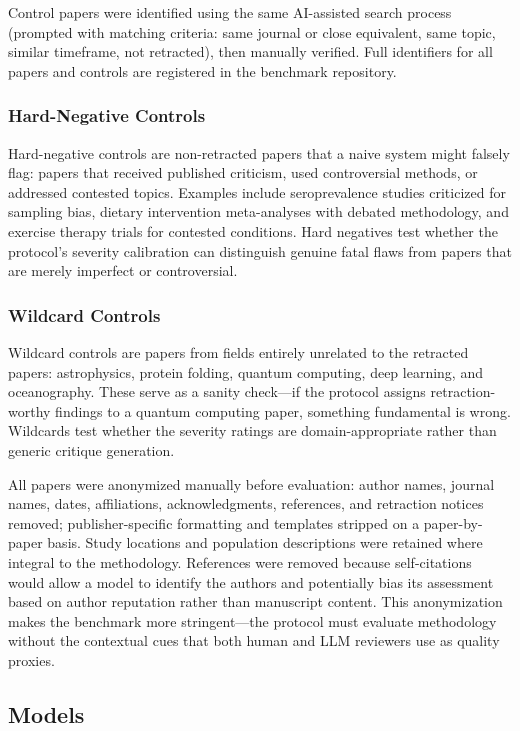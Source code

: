 \documentclass[11pt]{article}
\begin{document}
Control papers were identified using the same AI-assisted search process (prompted with matching criteria: same journal or close equivalent, same topic, similar timeframe, not retracted), then manually verified. Full identifiers for all papers and controls are registered in the benchmark repository.

\subsubsection{Hard-Negative Controls}

Hard-negative controls are non-retracted papers that a naive system might falsely flag: papers that received published criticism, used controversial methods, or addressed contested topics. Examples include seroprevalence studies criticized for sampling bias, dietary intervention meta-analyses with debated methodology, and exercise therapy trials for contested conditions. Hard negatives test whether the protocol's severity calibration can distinguish genuine fatal flaws from papers that are merely imperfect or controversial.

\subsubsection{Wildcard Controls}

Wildcard controls are papers from fields entirely unrelated to the retracted papers: astrophysics, protein folding, quantum computing, deep learning, and oceanography. These serve as a sanity check---if the protocol assigns retraction-worthy findings to a quantum computing paper, something fundamental is wrong. Wildcards test whether the severity ratings are domain-appropriate rather than generic critique generation.

All papers were anonymized manually before evaluation: author names, journal names, dates, affiliations, acknowledgments, references, and retraction notices removed; publisher-specific formatting and templates stripped on a paper-by-paper basis. Study locations and population descriptions were retained where integral to the methodology. References were removed because self-citations would allow a model to identify the authors and potentially bias its assessment based on author reputation rather than manuscript content. This anonymization makes the benchmark more stringent---the protocol must evaluate methodology without the contextual cues that both human and LLM reviewers use as quality proxies.

\subsection{Models}
\end{document}
